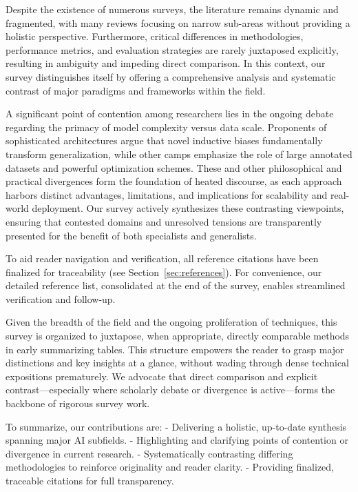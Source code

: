 \documentclass[sigconf]{acmart}
\begin{document}
Despite the existence of numerous surveys, the literature remains dynamic and fragmented, with many reviews focusing on narrow sub-areas without providing a holistic perspective. Furthermore, critical differences in methodologies, performance metrics, and evaluation strategies are rarely juxtaposed explicitly, resulting in ambiguity and impeding direct comparison. In this context, our survey distinguishes itself by offering a comprehensive analysis and systematic contrast of major paradigms and frameworks within the field.

A significant point of contention among researchers lies in the ongoing debate regarding the primacy of model complexity versus data scale. Proponents of sophisticated architectures argue that novel inductive biases fundamentally transform generalization, while other camps emphasize the role of large annotated datasets and powerful optimization schemes. These and other philosophical and practical divergences form the foundation of heated discourse, as each approach harbors distinct advantages, limitations, and implications for scalability and real-world deployment. Our survey actively synthesizes these contrasting viewpoints, ensuring that contested domains and unresolved tensions are transparently presented for the benefit of both specialists and generalists.

To aid reader navigation and verification, all reference citations have been finalized for traceability (see Section~\ref{sec:references}). For convenience, our detailed reference list, consolidated at the end of the survey, enables streamlined verification and follow-up.

Given the breadth of the field and the ongoing proliferation of techniques, this survey is organized to juxtapose, when appropriate, directly comparable methods in early summarizing tables. This structure empowers the reader to grasp major distinctions and key insights at a glance, without wading through dense technical expositions prematurely. We advocate that direct comparison and explicit contrast---especially where scholarly debate or divergence is active---forms the backbone of rigorous survey work.

To summarize, our contributions are:
- Delivering a holistic, up-to-date synthesis spanning major AI subfields.
- Highlighting and clarifying points of contention or divergence in current research.
- Systematically contrasting differing methodologies to reinforce originality and reader clarity.
- Providing finalized, traceable citations for full transparency.
\end{document}
